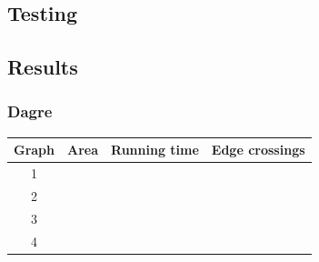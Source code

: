 \begin{landscape}

\section{Testing}



\subsection{Results}

\subsubsection{Dagre}

\begin{tabular}{ | c | c | c | c | }
    \hline
    Graph & Area & Running time & Edge crossings \\
    \hline
    1     & & & \\
    \hline
    2     & & & \\
    \hline
    3     & & & \\
    \hline
    4     & & & \\
    \hline
\end{tabular}



\end{landscape}